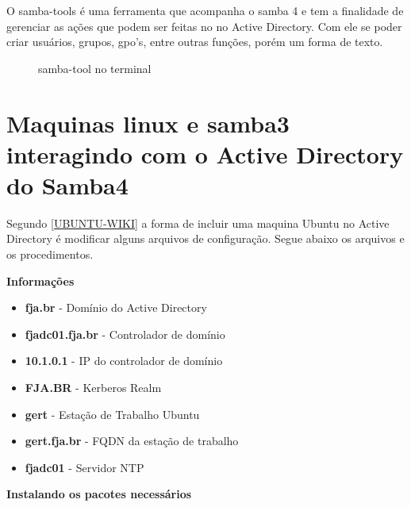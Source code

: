 O samba-tools é uma ferramenta que acompanha o samba 4 e tem a finalidade de gerenciar as ações que podem ser feitas no no Active Directory. Com ele se poder criar usuários, grupos, gpo's, entre outras funções, porém um forma de texto.

\begin{figure}[ht]
   	\centering
   	\caption{samba-tool no terminal}
    \label{Samba-tool}
\end{figure}

\section{Maquinas linux e samba3 interagindo com o Active Directory do  Samba4}

Segundo \cite{UBUNTU-WIKI} \ref{UBUNTU-WIKI} a forma de incluir uma maquina Ubuntu no Active Directory é modificar alguns arquivos de configuração.
Segue abaixo os arquivos e os procedimentos.

\textbf{Informações}

\begin{itemize}
	\item \textbf{fja.br} -  Domínio do Active Directory
	\item \textbf{fjadc01.fja.br} - Controlador de domínio
	\item \textbf{10.1.0.1} - IP do controlador de domínio
	\item \textbf{FJA.BR} - Kerberos Realm
	\item \textbf{gert} - Estação de Trabalho Ubuntu
	\item \textbf{gert.fja.br} - FQDN da estação de trabalho
	\item \textbf{fjadc01} - Servidor NTP
\end{itemize}

\textbf{Instalando os pacotes necessários}

